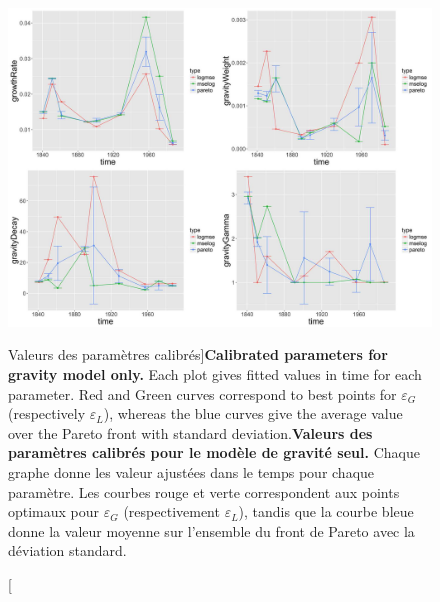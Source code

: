 \begin{figure}
\includegraphics[width=\linewidth]{Figures/Final/4-3-2-fig-interactiongibrat-gravity-params}
\caption[Calibrated parameters][Valeurs des paramètres calibrés]{\textbf{Calibrated parameters for gravity model only.} Each plot gives fitted values in time for each parameter. Red and Green curves correspond to best points for $\varepsilon_G$ (respectively $\varepsilon_L$), whereas the blue curves give the average value over the Pareto front with standard deviation.\label{fig:interactiongibrat:gravity-params}}{\textbf{Valeurs des paramètres calibrés pour le modèle de gravité seul.} Chaque graphe donne les valeur ajustées dans le temps pour chaque paramètre. Les courbes rouge et verte correspondent aux points optimaux pour $\varepsilon_G$ (respectivement $\varepsilon_L$), tandis que la courbe bleue donne la valeur moyenne sur l'ensemble du front de Pareto avec la déviation standard.\label{fig:interactiongibrat:gravity-params}}
\end{figure}


